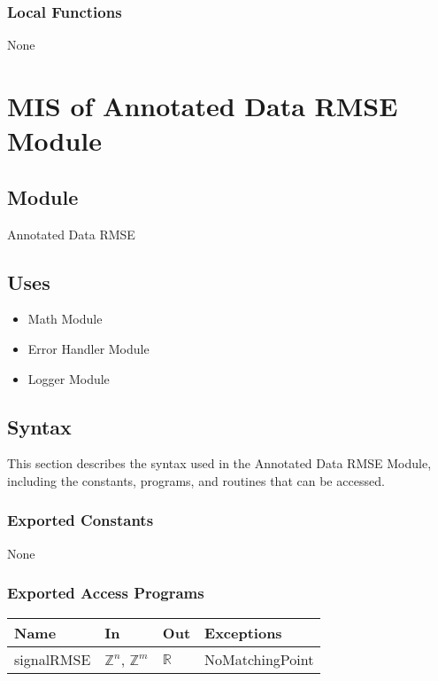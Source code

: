\documentclass[12pt, titlepage]{article}
\begin{document}
\subsubsection{Local Functions}

None

\newpage

\section{MIS of Annotated Data RMSE Module} \label{MIS_RMSE}

\subsection{Module}

Annotated Data RMSE

\subsection{Uses}

\begin{itemize}
\item Math Module
\item Error Handler Module
\item Logger Module
\end{itemize}

\subsection{Syntax}

This section describes the syntax used in the Annotated Data RMSE Module,
including the constants, programs, and routines that can be accessed.

\subsubsection{Exported Constants}

None

\subsubsection{Exported Access Programs}

\begin{center}
\begin{tabular}{p{2cm} p{4cm} p{4cm} p{5cm}}
\hline
\textbf{Name} & \textbf{In} & \textbf{Out} & \textbf{Exceptions} \\
\hline
signalRMSE & $\mathbb{Z}^n$, $\mathbb{Z}^m$ & $\mathbb{R}$ & NoMatchingPoint \\
\hline
\end{tabular}
\end{center}
\end{document}
